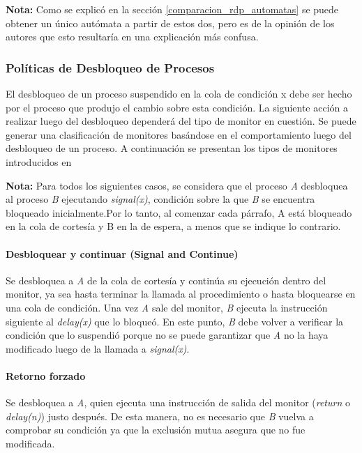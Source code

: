 \begin{framed}
\textbf{Nota:} Como se explicó en la sección \ref{comparacion_rdp_automatas} se
puede obtener un único autómata a partir de estos dos, pero es de la opinión de los autores
que esto resultaría en una explicación más confusa.
\end{framed}

\subsubsection{Políticas de Desbloqueo de Procesos}
\label{politica_monitor}
El desbloqueo de un proceso suspendido en la cola de condición x debe ser hecho
por el proceso que produjo el cambio sobre esta condición. La siguiente acción a
realizar luego del desbloqueo dependerá del tipo de monitor en cuestión.
Se puede generar una clasificación de monitores basándose en el comportamiento
luego del desbloqueo de un proceso. A continuación se presentan los tipos de
monitores introducidos en \cite{PalmaConcurrente}

\begin{framed}
\textbf{Nota:} Para todos los siguientes casos, se considera que el proceso
\textit{A} desbloquea al proceso \textit{B} ejecutando \textit{signal(x)},
condición sobre la que \textit{B} se encuentra bloqueado inicialmente.Por lo
tanto, al comenzar cada párrafo, A está bloqueado en la cola de cortesía y B en
la de espera, a menos que se indique lo contrario.
\end{framed}

\paragraph{Desbloquear y continuar (Signal and Continue)}
Se desbloquea a \textit{A} de la cola de cortesía y continúa su ejecución dentro
del monitor, ya sea hasta terminar la llamada al procedimiento o hasta bloquearse
en una cola de condición. Una vez \textit{A} sale del monitor, \textit{B}
ejecuta la instrucción siguiente al \textit{delay(x)} que lo bloqueó. En este
punto, \textit{B} debe volver a verificar la condición que lo suspendió porque
no se puede garantizar que \textit{A} no la haya modificado luego de la llamada
a \textit{signal(x)}.

\paragraph{Retorno forzado}
Se desbloquea a \textit{A}, quien ejecuta una instrucción de salida del monitor
(\textit{return} o \textit{delay(n)}) justo después. De esta manera, no es
necesario que \textit{B} vuelva a comprobar su condición ya que la exclusión
mutua asegura que no fue modificada.


